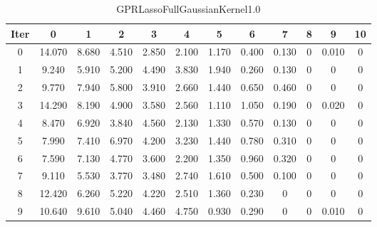 \begin{table}
	\begin{center}
		\begin{tabular}{|c|c|c|c|c|c|c|c|c|c|c|c|}
			\hline
			Iter & 0 & 1 & 2 & 3 & 4 & 5 & 6 & 7 & 8 & 9 & 10 \\
			\hline
			0 & 14.070 & 8.680 & 4.510 & 2.850 & 2.100 & 1.170 & 0.400 & 0.130 & 0 & 0.010 & 0 \\
			\hline
			1 & 9.240 & 5.910 & 5.200 & 4.490 & 3.830 & 1.940 & 0.260 & 0.130 & 0 & 0 & 0 \\
			\hline
			2 & 9.770 & 7.940 & 5.800 & 3.910 & 2.660 & 1.440 & 0.650 & 0.460 & 0 & 0 & 0 \\
			\hline
			3 & 14.290 & 8.190 & 4.900 & 3.580 & 2.560 & 1.110 & 1.050 & 0.190 & 0 & 0.020 & 0 \\
			\hline
			4 & 8.470 & 6.920 & 3.840 & 4.560 & 2.130 & 1.330 & 0.570 & 0.130 & 0 & 0 & 0 \\
			\hline
			5 & 7.990 & 7.410 & 6.970 & 4.200 & 3.230 & 1.440 & 0.780 & 0.310 & 0 & 0 & 0 \\
			\hline
			6 & 7.590 & 7.130 & 4.770 & 3.600 & 2.200 & 1.350 & 0.960 & 0.320 & 0 & 0 & 0 \\
			\hline
			7 & 9.110 & 5.530 & 3.770 & 3.480 & 2.740 & 1.610 & 0.500 & 0.100 & 0 & 0 & 0 \\
			\hline
			8 & 12.420 & 6.260 & 5.220 & 4.220 & 2.510 & 1.360 & 0.230 & 0 & 0 & 0 & 0 \\
			\hline
			9 & 10.640 & 9.610 & 5.040 & 4.460 & 4.750 & 0.930 & 0.290 & 0 & 0 & 0.010 & 0 \\
			\hline
		\end{tabular}
	\end{center}
	\caption{GPRLassoFullGaussianKernel1.0}
\end{table}